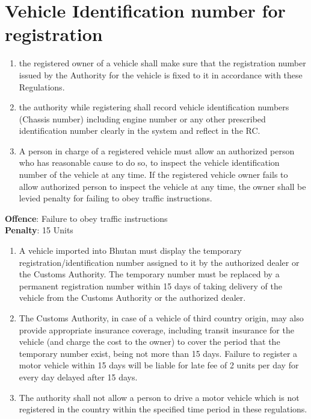 \documentclass[
]{book}
\providecommand{\tightlist}{%
  \setlength{\itemsep}{0pt}\setlength{\parskip}{0pt}}
\begin{document}
\hypertarget{vehicle-identification-number-for-registration}{%
\section{Vehicle Identification number for registration}\label{vehicle-identification-number-for-registration}}

\begin{enumerate}
\def\labelenumi{\alph{enumi}.}
\tightlist
\item
  the registered owner of a vehicle shall make sure that the registration number issued by the Authority for the vehicle is fixed to it in accordance with these Regulations.
\item
  the authority while registering shall record vehicle identification numbers (Chassis number) including engine number or any other prescribed identification number clearly in the system and reflect in the RC.
\item
  A person in charge of a registered vehicle must allow an authorized person who has reasonable cause to do so, to inspect the vehicle identification number of the vehicle at any time. If the registered vehicle owner fails to allow authorized person to inspect the vehicle at any time, the owner shall be levied penalty for failing to obey traffic instructions.
\end{enumerate}

\textbf{Offence}: Failure to obey traffic instructions\\
\textbf{Penalty}: 15 Units

\begin{enumerate}
\def\labelenumi{\alph{enumi}.}
\setcounter{enumi}{3}
\tightlist
\item
  A vehicle imported into Bhutan must display the temporary registration/identification number assigned to it by the authorized dealer or the Customs Authority. The temporary number must be replaced by a permanent registration number within 15 days of taking delivery of the vehicle from the Customs Authority or the authorized dealer.
\item
  The Customs Authority, in case of a vehicle of third country origin, may also provide appropriate insurance coverage, including transit insurance for the vehicle (and charge the cost to the owner) to cover the period that the temporary number exist, being not more than 15 days. Failure to register a motor vehicle within 15 days will be liable for late fee of 2 units per day for every day delayed after 15 days.
\item
  The authority shall not allow a person to drive a motor vehicle which is not registered in the country within the specified time period in these regulations.
\end{enumerate}
\end{document}
